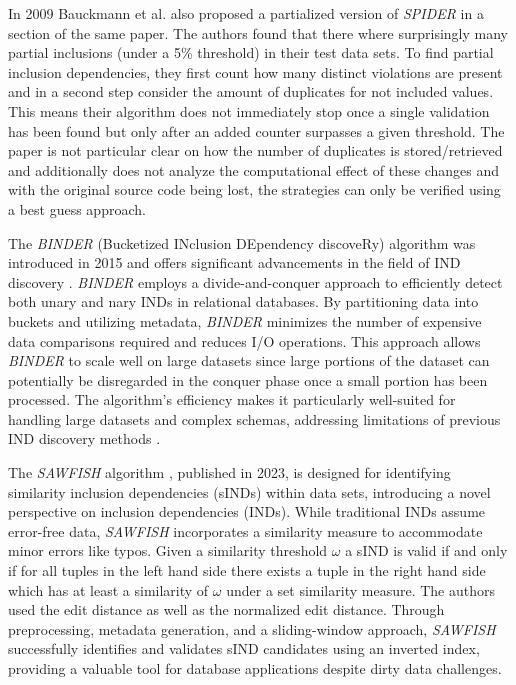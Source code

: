 In 2009 Bauckmann et al. also proposed a partialized version of \textit{SPIDER} in a section of the same paper. The authors found that there where surprisingly many partial inclusions (under a 5\% threshold) in their test data sets. To find partial inclusion dependencies, they first count how many distinct violations are present and in a second step consider the amount of duplicates for not included values. This means their algorithm does not immediately stop once a single validation has been found but only after an added counter surpasses a given threshold. The paper is not particular clear on how the number of duplicates is stored/retrieved and additionally does not analyze the computational effect of these changes and with the original source code being lost, the strategies can only be verified using a best guess approach.

The \textit{BINDER} (Bucketized INclusion DEpendency discoveRy) algorithm was introduced in 2015 and offers significant advancements in the field of IND discovery \cite{papenbrock2015divide}. \textit{BINDER} employs a divide-and-conquer approach to efficiently detect both unary and nary INDs in relational databases. By partitioning data into buckets and utilizing metadata, \textit{BINDER} minimizes the number of expensive data comparisons required and reduces I/O operations. This approach allows \textit{BINDER} to scale well on large datasets since large portions of the dataset can potentially be disregarded in the conquer phase once a small portion has been processed. The algorithm's efficiency makes it particularly well-suited for handling large datasets and complex schemas, addressing limitations of previous IND discovery methods \cite{dursch2019inclusion}.

The \textit{SAWFISH} algorithm \cite{kaminsky2023discovering}, published in 2023, is designed for identifying similarity inclusion dependencies (sINDs) within data sets, introducing a novel perspective on inclusion dependencies (INDs). While traditional INDs assume error-free data, \textit{SAWFISH} incorporates a similarity measure to accommodate minor errors like typos. Given a similarity threshold $\omega$ a sIND is valid if and only if for all tuples in the left hand side there exists a tuple in the right hand side which has at least a similarity of $\omega$ under a set similarity measure. The authors used the edit distance as well as the normalized edit distance. Through preprocessing, metadata generation, and a sliding-window approach, \textit{SAWFISH} successfully identifies and validates sIND candidates using an inverted index, providing a valuable tool for database applications despite dirty data challenges.

